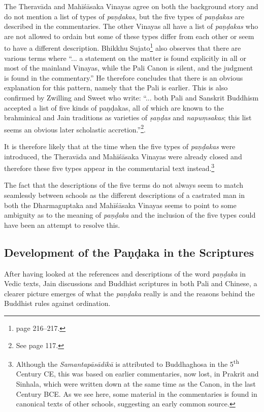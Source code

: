 The Theravāda and Mahīśāsaka Vinayas agree on both the background story and do not mention a list of types of {\em paṇḍakas}, but the five types of {\em paṇḍakas} are described in the commentaries. The other Vinayas all have a list of {\em paṇḍakas} who are not allowed to ordain but some of these types differ from each other or seem to have a different description. Bhikkhu Sujato\footnote{\cite{sujato2009} page 216–217.} also observes that there are various terms where ``... a statement on the matter is found explicitly in all or most of the mainland Vinayas, while the Pali Canon is silent, and the judgment is found in the commentary.'' He therefore concludes that there is an obvious explanation for this pattern, namely that the Pali is earlier. This is also confirmed by Zwilling and Sweet who write: ``... both Pali and Sanskrit Buddhism accepted a list of five kinds of paṇḍakas, all of which are known to the brahminical and Jain traditions as varieties of {\em ṣaṇḍas} and {\em napuṃsakas}; this list seems an obvious later scholastic accretion.''\footnote{See \cite{zwilling2000} page 117.}.

It is therefore likely that at the time when the five types of {\em paṇḍakas} were introduced, the Theravāda and Mahīśāsaka Vinayas were already closed and therefore these five types appear in the commentarial text instead.\footnote{Although the {\em Samantapāsādikā} is attributed to Buddhaghosa in the 5\textsuperscript{th} Century CE, this was based on earlier commentaries, now lost, in Prakrit and Sinhala, which were written down at the same time as the Canon, in the last Century BCE. As we see here, some material in the commentaries is found in canonical texts of other schools, suggesting an early common source.} 

The fact that the descriptions of the five terms do not always seem to match seamlessly between schools as the different descriptions of a castrated man in both the Dharmaguptaka and Mahīśāsaka Vinayas seems to point to some ambiguity as to the meaning of {\em paṇḍaka} and the inclusion of the five types could have been an attempt to resolve this.


\subsection{Development of the Paṇḍaka in the Scriptures}
After having looked at the references and descriptions of the word {\em paṇḍaka} in Vedic texts, Jain discussions and Buddhist scriptures in both Pali and Chinese, a clearer picture emerges of what the {\em paṇḍaka} really is and the reasons behind the Buddhist rules against ordination.

